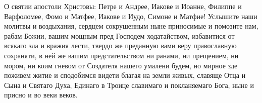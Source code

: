 

\label{_content_molitvi-svyatim}



\begin{mymulticols}




 О святии апостоли Христовы: Петре и  Андрее, Иакове и Иоанне, Филиппе и Варфоломее, Фомо и Матфее, Иакове и Иудо, Симоне и Матфие! Услышите наши молитвы и воздыхания, сердцем сокрушенным  ныне приносимые и помозите нам, рабам Божии, вашим мощным пред Господем ходатайством, избавитися от всякаго зла и вражия лести, твердо же преданную вами веру православную сохраняти, в ней же вашим предстательством ни ранами, ни прещением, ни мором, ни коим гневом  от Создателя нашего умалени будем, но мирное зде поживем житие и сподобимся видети благая на земли живых, славяще Отца и Сына и Святаго Духа, Единаго в Троице славимаго и покланяемаго Бога, ныне и присно и во веки веков.

\end{mymulticols}

\mychapterending


